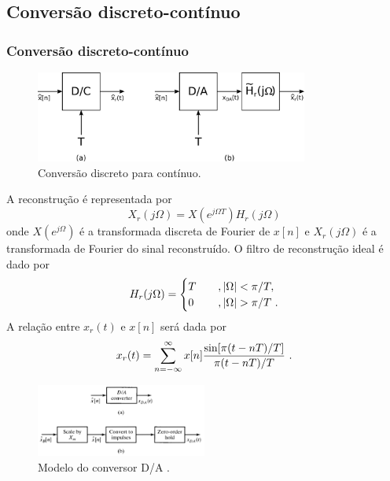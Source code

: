 \subsection{Conversão discreto-contínuo}
\begin{frame}[allowframebreaks]
  \frametitle{Conversão discreto-contínuo}
  \begin{figure}[h!]
  \centering
  \includegraphics[width=0.8\textwidth]{images/da-conversion.pdf}
  \caption{Conversão discreto para contínuo.}
  \label{fig:da-conversion}
  \end{figure}

  \framebreak

  A reconstrução é representada por
  \begin{equation}
  X_r (j\Omega) = X(e^{j\Omega T}) H_r(j\Omega)
  \end{equation}
  onde $X(e^{j\Omega})$ é a transformada discreta de Fourier de $x[n]$ e $X_r(j\Omega)$
  é a transformada de Fourier do sinal reconstruído. O filtro de reconstrução ideal é dado por
  \begin{equation}
  H_r(j\Omega) = \begin{cases} T  \quad &, |\Omega|  < \pi/T ,\\ 0 &, |\Omega| > \pi/T \textmd{ .}\end{cases}
  \end{equation}
  A relação entre $x_r(t)$ e $x[n]$ será dada por
  \begin{equation}
  x_r (t) = \sum_{n=-\infty}^{\infty} x[n] \frac{\sin [\pi (t-nT)/T]}{\pi(t-nT)/T} \textmd{ .}
  \end{equation}

  \framebreak

  \begin{figure}[h!]
  \centering
  \includegraphics[width=0.5\textwidth]{images/oppenheim_fig453.png}
  \caption{Modelo do conversor D/A \citep{oppenheim2009}.}
  \label{fig:oppenheim_fig453}
  \end{figure}


\end{frame}
